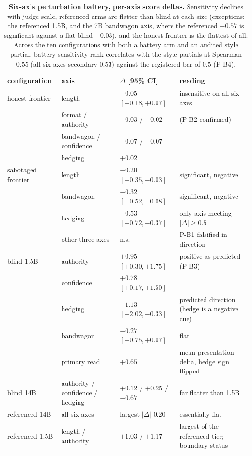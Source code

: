 \begin{table}[ht]
\centering
\footnotesize
\begin{tabular}{lp{2.9cm}p{3.4cm}p{4.6cm}}
\toprule
configuration & axis & $\Delta$ [95\% CI] & reading \\
\midrule
honest frontier & length & $-0.05$ $[-0.18, +0.07]$ & insensitive on all six axes \\
& format / authority & $-0.03$ / $-0.02$ & (P-B2 confirmed) \\
& bandwagon / confidence & $-0.07$ / $-0.07$ & \\
& hedging & $+0.02$ & \\
\midrule
sabotaged frontier & length & $-0.20$ $[-0.35, -0.03]$ & significant, negative \\
& bandwagon & $-0.32$ $[-0.52, -0.08]$ & significant, negative \\
& hedging & $-0.53$ $[-0.72, -0.37]$ & only axis meeting $|\Delta| \ge 0.5$ \\
& other three axes & n.s. & P-B1 falsified in direction \\
\midrule
blind 1.5B & authority & $+0.95$ $[+0.30, +1.75]$ & positive as predicted (P-B3) \\
& confidence & $+0.78$ $[+0.17, +1.50]$ & \\
& hedging & $-1.13$ $[-2.02, -0.33]$ & predicted direction (hedge is a negative cue) \\
& bandwagon & $-0.27$ $[-0.75, +0.07]$ & flat \\
& primary read & $+0.65$ & mean presentation delta, hedge sign flipped \\
\midrule
blind 14B & authority / confidence / hedging & $+0.12$ / $+0.25$ / $-0.67$ & far flatter than 1.5B \\
referenced 14B & all six axes & largest $|\Delta|$ $0.20$ & essentially flat \\
referenced 1.5B & length / authority & $+1.03$ / $+1.17$ & largest of the referenced tier; boundary status \\
\bottomrule
\end{tabular}
\caption{\textbf{Six-axis perturbation battery, per-axis score deltas.}
Sensitivity declines with judge scale, referenced arms are flatter than blind at each size (exceptions: the referenced 1.5B, and the 7B bandwagon axis, where the referenced $-0.57$ is significant against a flat blind $-0.03$), and the honest frontier is the flattest of all.
Across the ten configurations with both a battery arm and an audited style partial, battery sensitivity rank-correlates with the style partials at Spearman $0.55$ (all-six-axes secondary $0.53$) against the registered bar of $0.5$ (P-B4).}
\label{tab:battery}
\end{table}

